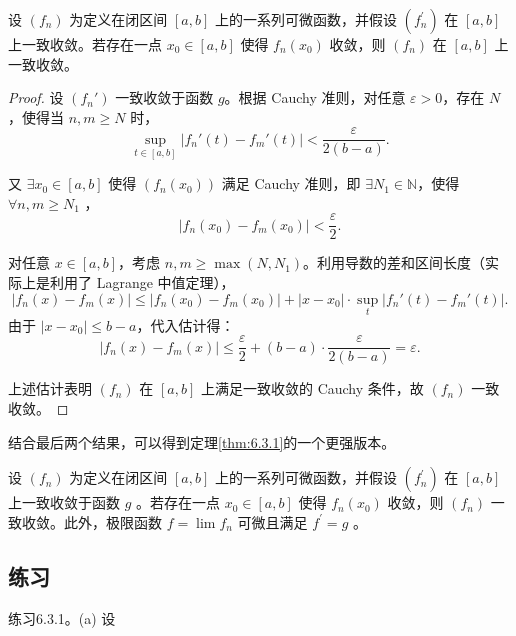 \begin{Thm}
  设 \(\left( {f}_{n}\right)\) 为定义在闭区间 \(\left\lbrack  {a,b}\right\rbrack\) 上的一系列可微函数，并假设 \(\left( {f}_{n}^{\prime }\right)\) 在 \(\left\lbrack  {a,b}\right\rbrack\) 上一致收敛。若存在一点 \({x}_{0} \in  \left\lbrack  {a,b}\right\rbrack\) 使得 \({f}_{n}\left( {x}_{0}\right)\) 收敛，则 \(\left( {f}_{n}\right)\) 在 \(\left\lbrack  {a,b}\right\rbrack\) 上一致收敛。
\end{Thm}
\begin{proof}

设 \((f_n')\) 一致收敛于函数 \(g\)。根据 Cauchy 准则，对任意 \(\varepsilon > 0\)，存在 \(N\)，使得当 \(n,m \geq N\) 时，
   \[
   \sup_{t \in [a,b]} |f_n'(t) - f_m'(t)| < \frac{\varepsilon}{2(b-a)}.
   \]

又 \( \exists x_0 \in [a,b]\) 使得 \((f_n(x_0))\) 满足 Cauchy 准则，即 \(\exists N_1\in \mathbb{N}\)，使得 \(\forall n,m \geq N_1\) ，
   \[
   |f_n(x_0) - f_m(x_0)| < \frac{\varepsilon}{2}.
   \]

对任意 \(x \in [a,b]\)，考虑 \(n,m \geq \max(N, N_1)\)。利用导数的差和区间长度（实际上是利用了 Lagrange 中值定理），
   \[
   |f_n(x) - f_m(x)| \leq |f_n(x_0) - f_m(x_0)| + |x - x_0| \cdot \sup_{t} |f_n'(t) - f_m'(t)|.
   \]
   由于 \(|x - x_0| \leq b - a\)，代入估计得：
   \[
   |f_n(x) - f_m(x)| \leq \frac{\varepsilon}{2} + (b-a) \cdot \frac{\varepsilon}{2(b-a)} = \varepsilon.
   \]

上述估计表明 \((f_n)\) 在 \([a,b]\) 上满足一致收敛的 Cauchy 条件，故 \((f_n)\) 一致收敛。
\end{proof}

结合最后两个结果，可以得到定理\ref{thm:6.3.1}的一个更强版本。

\begin{Thm}\label{thm:6.3.3}
设 \(\left( {f}_{n}\right)\) 为定义在闭区间 \(\left\lbrack  {a,b}\right\rbrack\) 上的一系列可微函数，并假设 \(\left( {f}_{n}^{\prime }\right)\) 在 \(\left\lbrack  {a,b}\right\rbrack\) 上一致收敛于函数 \(g\) 。若存在一点 \({x}_{0} \in  \left\lbrack  {a,b}\right\rbrack\) 使得 \({f}_{n}\left( {x}_{0}\right)\) 收敛，则 \(\left( {f}_{n}\right)\) 一致收敛。此外，极限函数 \(f = \lim {f}_{n}\) 可微且满足 \({f}^{\prime } = g\) 。  
\end{Thm}


\subsection{练习}

练习6.3.1。(a) 设

